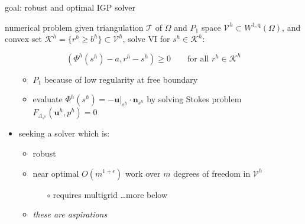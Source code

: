 \documentclass[usepdftitle=false,usenames,dvipsnames]{beamer}
\newcommand{\eps}{\epsilon}
\newcommand{\bn}{\mathbf{n}}
\newcommand{\bu}{\mathbf{u}}
\newcommand{\ip}[2]{\left(#1,#2\right)}
\newcommand{\qq}{{\text{q}}}
\begin{document}
\begin{frame}{goal: robust and optimal IGP solver}

\begin{block}{numerical problem}
given triangulation $\mathcal{T}$ of $\Omega$ and $P_1$ space $\mathcal{V}^h \subset W^{1,\qq}(\Omega)$, and convex set $\mathcal{K}^h = \{r^h \ge b^h\} \subset \mathcal{V}^h$, solve VI for $s^h \in \mathcal{K}^h$:

$$\ip{\Phi^h(s^h) - a}{r^h - s^h} \ge 0 \qquad \text{for all $r^h \in \mathcal{K}^h$}$$
\end{block}

\begin{itemize}
\item[]
    \begin{itemize}
    \item $P_1$ because of low regularity at free boundary
    \item evaluate $\Phi^h(s^h)=-\bu|_{s^h}\cdot\bn_{s^h}$ by solving Stokes problem $F_{\Lambda_{s^h}}(\bu^h,p^h)=0$
    \end{itemize}
\item seeking a solver which is:
    \begin{itemize}
    \item \alert{robust}
    \item \alert{near optimal} $O(m^{1+\eps})$ work over $m$ degrees of freedom in $\mathcal{V}^h$
        \begin{itemize}
        \item[{\color{black} $\circ$}] requires multigrid \dots more below
        \end{itemize}
    \item \emph{these are aspirations}
    \end{itemize}
\end{itemize}
\end{frame}
\end{document}
